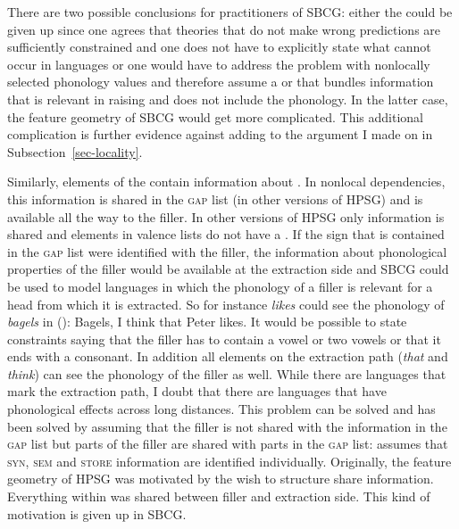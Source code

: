 \documentclass[output=paper]{langsci/langscibook}
\begin{document}
There are two possible conclusions for practitioners of SBCG: either the \motherf could be given up
since one agrees that theories that do not make wrong predictions are sufficiently constrained and
one does not have to explicitly state what cannot occur in languages or one would have to address
the problem with nonlocally selected phonology values and therefore assume a \synsem or \localf that
bundles information that is relevant in raising and does not include the
phonology.
In the latter case, the feature geometry of SBCG would get more complicated. This additional
complication is further evidence against \mother adding to the argument I made on \mother in Subsection~\ref{sec-locality}.

\label{sec-local-feature-sbcg}

Similarly, elements of the \argstl contain information about \form. In nonlocal dependencies, this information is shared in the \textsc{gap} list (\slashl in other versions of
HPSG) and is available all the way to the filler. In other versions of HPSG only \local information is shared and elements in valence lists
do not have a \phonf. If the sign that is contained in the \textsc{gap} list were identified with
the filler, the information about phonological properties of the filler would be available at the
extraction side and SBCG could be used to model languages in which the phonology of
a filler is relevant for a head from which it is extracted. So for instance \emph{likes} could see the
phonology of \emph{bagels} in ():
\ea
Bagels, I think that Peter likes.
\z
It would be possible to state constraints saying that the filler has to contain a vowel or two
vowels or that it ends with a consonant. In addition all elements on the extraction path
(\emph{that} and \emph{think}) can see the phonology of the filler as well. While there are
languages that mark the extraction path, I doubt that there are languages that have phonological
effects across long distances. This problem can be solved and has been solved by assuming that the
filler is not shared with the information in the \textsc{gap} list but parts of the filler are
shared with parts in the \textsc{gap} list: \citet[]{Sag2012a} assumes that \textsc{syn},
\textsc{sem} and \textsc{store} information are identified individually. Originally, the feature
geometry of HPSG was motivated by the wish to structure share information. Everything within \local
was shared between filler and extraction side. This kind of motivation is given up in SBCG.
\end{document}
